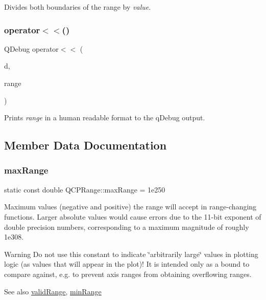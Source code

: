 Divides both boundaries of the range by {\itshape value}. \mbox{\label{class_q_c_p_range_ab4b7d434541ec2e2e00ef3764dde90d8}} 
\subsubsection{\texorpdfstring{operator$<$$<$()}{operator<<()}}
{\footnotesize\ttfamily Q\+Debug operator$<$$<$ (\begin{DoxyParamCaption}\item[{Q\+Debug}]{d,  }\item[{const \hyperlink{class_q_c_p_range}{Q\+C\+P\+Range} \&}]{range }\end{DoxyParamCaption})\hspace{0.3cm}{\ttfamily [related]}}

Prints {\itshape range} in a human readable format to the q\+Debug output. 

\subsection{Member Data Documentation}
\mbox{\label{class_q_c_p_range_a34c2817056d5eb5c32524e34a85b4255}} 
\subsubsection{\texorpdfstring{max\+Range}{maxRange}}
{\footnotesize\ttfamily static const double Q\+C\+P\+Range\+::max\+Range = 1e250\hspace{0.3cm}{\ttfamily [static]}}

Maximum values (negative and positive) the range will accept in range-\/changing functions. Larger absolute values would cause errors due to the 11-\/bit exponent of double precision numbers, corresponding to a maximum magnitude of roughly 1e308.

\begin{DoxyWarning}{Warning}
Do not use this constant to indicate \char`\"{}arbitrarily large\char`\"{} values in plotting logic (as values that will appear in the plot)! It is intended only as a bound to compare against, e.\+g. to prevent axis ranges from obtaining overflowing ranges.
\end{DoxyWarning}
\begin{DoxySeeAlso}{See also}
\hyperlink{class_q_c_p_range_ab38bd4841c77c7bb86c9eea0f142dcc0}{valid\+Range}, \hyperlink{class_q_c_p_range_a95e4931d712418c3020517cbec669ed1}{min\+Range} 
\end{DoxySeeAlso}
\mbox{\label{class_q_c_p_range_a95e4931d712418c3020517cbec669ed1}} 

